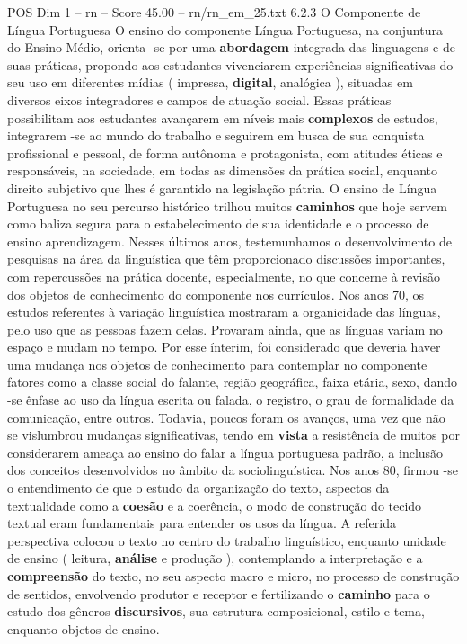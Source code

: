 \begin{textsample}{POS Dim 1 – rn – Score 45.00 – rn/rn\_em\_25.txt}  \label{ex:f1_pos_265}
6.2.3 O Componente de Língua Portuguesa O ensino do componente Língua Portuguesa, na conjuntura do Ensino Médio, orienta -se por uma \textbf{abordagem} integrada das linguagens e de suas práticas, propondo aos estudantes vivenciarem experiências significativas do seu uso em diferentes mídias ( impressa, \textbf{digital}, analógica ), situadas em diversos eixos integradores e campos de atuação social.
Essas práticas possibilitam aos estudantes avançarem em níveis mais \textbf{complexos} de estudos, integrarem -se ao mundo do trabalho e seguirem em busca de sua conquista profissional e pessoal, de forma autônoma e protagonista, com atitudes éticas e responsáveis, na sociedade, em todas as dimensões da prática social, enquanto direito subjetivo que lhes é garantido na legislação pátria.
O ensino de Língua Portuguesa no seu percurso histórico trilhou muitos \textbf{caminhos} que hoje servem como baliza segura para o estabelecimento de sua identidade e o processo de ensino aprendizagem.
Nesses últimos anos, testemunhamos o desenvolvimento de pesquisas na área da linguística que têm proporcionado discussões importantes, com repercussões na prática docente, especialmente, no que concerne à revisão dos objetos de conhecimento do componente nos currículos.
Nos anos 70, os estudos referentes à variação linguística mostraram a organicidade das línguas, pelo uso que as pessoas fazem delas.
Provaram ainda, que as línguas variam no espaço e mudam no tempo.
Por esse ínterim, foi considerado que deveria haver uma mudança nos objetos de conhecimento para contemplar no componente fatores como a classe social do falante, região geográfica, faixa etária, sexo, dando -se ênfase ao uso da língua escrita ou falada, o registro, o grau de formalidade da comunicação, entre outros.
Todavia, poucos foram os avanços, uma vez que não se vislumbrou mudanças significativas, tendo em \textbf{vista} a resistência de muitos por considerarem ameaça ao ensino do falar a língua portuguesa padrão, a inclusão dos conceitos desenvolvidos no âmbito da sociolinguística.
Nos anos 80, firmou -se o entendimento de que o estudo da organização do texto, aspectos da textualidade como a \textbf{coesão} e a coerência, o modo de construção do tecido textual eram fundamentais para entender os usos da língua.
A referida perspectiva colocou o texto no centro do trabalho linguístico, enquanto unidade de ensino ( leitura, \textbf{análise} e produção ), contemplando a interpretação e a \textbf{compreensão} do texto, no seu aspecto macro e micro, no processo de construção de sentidos, envolvendo produtor e receptor e fertilizando o \textbf{caminho} para o estudo dos gêneros \textbf{discursivos}, sua estrutura composicional, estilo e tema, enquanto objetos de ensino.

\end{textsample}
